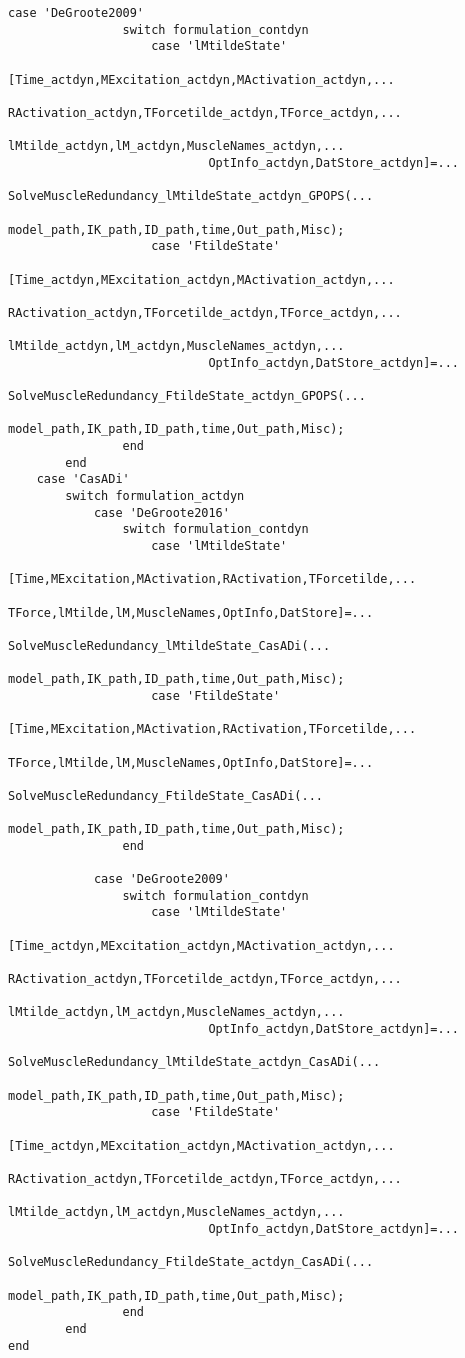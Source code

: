 \documentclass[a4paper,oneside,11pt]{article}
\begin{document}
\begin{lstlisting}[frame=none,basicstyle=\tiny]
            case 'DeGroote2009' 
                switch formulation_contdyn
                    case 'lMtildeState'
                        [Time_actdyn,MExcitation_actdyn,MActivation_actdyn,...
                            RActivation_actdyn,TForcetilde_actdyn,TForce_actdyn,...
                            lMtilde_actdyn,lM_actdyn,MuscleNames_actdyn,...
                            OptInfo_actdyn,DatStore_actdyn]=...
                            SolveMuscleRedundancy_lMtildeState_actdyn_GPOPS(...
                            model_path,IK_path,ID_path,time,Out_path,Misc);
                    case 'FtildeState'   
                        [Time_actdyn,MExcitation_actdyn,MActivation_actdyn,...
                            RActivation_actdyn,TForcetilde_actdyn,TForce_actdyn,...
                            lMtilde_actdyn,lM_actdyn,MuscleNames_actdyn,...
                            OptInfo_actdyn,DatStore_actdyn]=...
                            SolveMuscleRedundancy_FtildeState_actdyn_GPOPS(...
                            model_path,IK_path,ID_path,time,Out_path,Misc);
                end
        end
    case 'CasADi'
        switch formulation_actdyn
            case 'DeGroote2016'      
                switch formulation_contdyn
                    case 'lMtildeState'
                        [Time,MExcitation,MActivation,RActivation,TForcetilde,...
                            TForce,lMtilde,lM,MuscleNames,OptInfo,DatStore]=...
                            SolveMuscleRedundancy_lMtildeState_CasADi(...
                            model_path,IK_path,ID_path,time,Out_path,Misc);
                    case 'FtildeState'   
                        [Time,MExcitation,MActivation,RActivation,TForcetilde,...
                            TForce,lMtilde,lM,MuscleNames,OptInfo,DatStore]=...
                            SolveMuscleRedundancy_FtildeState_CasADi(...
                            model_path,IK_path,ID_path,time,Out_path,Misc);
                end

            case 'DeGroote2009'
                switch formulation_contdyn
                    case 'lMtildeState'
                        [Time_actdyn,MExcitation_actdyn,MActivation_actdyn,...
                            RActivation_actdyn,TForcetilde_actdyn,TForce_actdyn,...
                            lMtilde_actdyn,lM_actdyn,MuscleNames_actdyn,...
                            OptInfo_actdyn,DatStore_actdyn]=...
                            SolveMuscleRedundancy_lMtildeState_actdyn_CasADi(...
                            model_path,IK_path,ID_path,time,Out_path,Misc);
                    case 'FtildeState'   
                        [Time_actdyn,MExcitation_actdyn,MActivation_actdyn,...
                            RActivation_actdyn,TForcetilde_actdyn,TForce_actdyn,...
                            lMtilde_actdyn,lM_actdyn,MuscleNames_actdyn,...
                            OptInfo_actdyn,DatStore_actdyn]=...
                            SolveMuscleRedundancy_FtildeState_actdyn_CasADi(...
                            model_path,IK_path,ID_path,time,Out_path,Misc);
                end
        end
end

\end{lstlisting}
\end{document}

